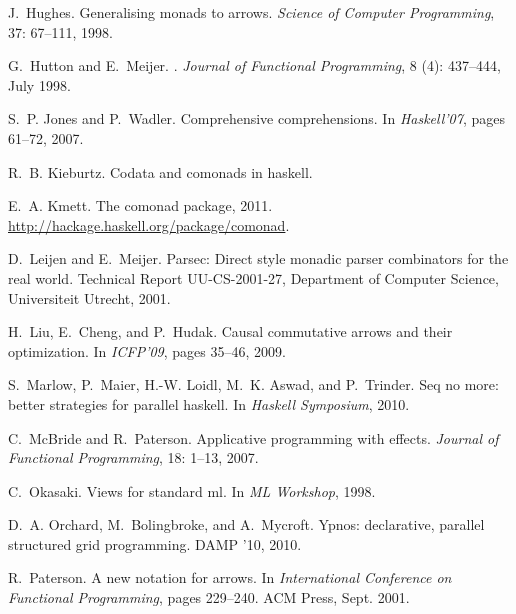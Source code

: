 \documentclass[preprint]{sigplanconf}
\begin{document}
\begin{thebibliography}{37}
J.~Hughes.
\newblock Generalising monads to arrows.
\newblock \emph{Science of Computer Programming}, 37: 67--111, 1998.

G.~Hutton and E.~Meijer.
.
\newblock \emph{Journal of Functional Programming}, 8 (4):
  437--444, July 1998.

S.~P. Jones and P.~Wadler.
\newblock Comprehensive comprehensions.
\newblock In \emph{Haskell'07}, pages 61--72, 2007.

R.~B. Kieburtz.
\newblock Codata and comonads in haskell.

E.~A. Kmett.
\newblock The comonad package, 2011.
\newblock \url{http://hackage.haskell.org/package/comonad}.

D.~Leijen and E.~Meijer.
\newblock Parsec: Direct style monadic parser combinators for the real world.
\newblock Technical Report UU-CS-2001-27, Department of Computer Science,
  Universiteit Utrecht, 2001.

H.~Liu, E.~Cheng, and P.~Hudak.
\newblock Causal commutative arrows and their optimization.
\newblock In \emph{ICFP'09}, pages 35--46, 2009.

S.~Marlow, P.~Maier, H.-W. Loidl, M.~K. Aswad, and P.~Trinder.
\newblock Seq no more: better strategies for parallel haskell.
\newblock In \emph{Haskell Symposium}, 2010.

C.~McBride and R.~Paterson.
\newblock Applicative programming with effects.
\newblock \emph{Journal of Functional Programming}, 18: 1--13, 2007.

C.~Okasaki.
\newblock Views for standard ml.
\newblock In \emph{ML Workshop}, 1998.

D.~A. Orchard, M.~Bolingbroke, and A.~Mycroft.
\newblock Ypnos: declarative, parallel structured grid programming.
\newblock DAMP '10, 2010.

R.~Paterson.
\newblock A new notation for arrows.
\newblock In \emph{International Conference on Functional Programming}, pages
  229--240. ACM Press, Sept. 2001.


\end{thebibliography}
\end{document}
